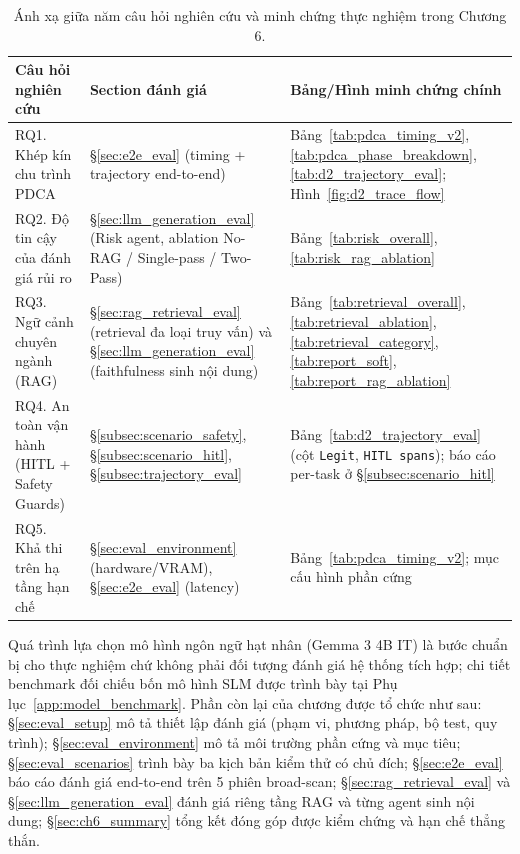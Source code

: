 \begin{table}[!htb]
  \centering
  \caption{Ánh xạ giữa năm câu hỏi nghiên cứu và minh chứng thực nghiệm trong Chương 6.}
  \label{tab:rq_metric_mapping}
  \small
  \begin{tabular}{p{3.6cm}p{6cm}p{4.8cm}}
    \toprule
    \textbf{Câu hỏi nghiên cứu} & \textbf{Section đánh giá} & \textbf{Bảng/Hình minh chứng chính} \\
    \midrule
    RQ1. Khép kín chu trình PDCA
       & \S\ref{sec:e2e_eval} (timing + trajectory end-to-end)
       & Bảng~\ref{tab:pdca_timing_v2}, \ref{tab:pdca_phase_breakdown}, \ref{tab:d2_trajectory_eval}; Hình~\ref{fig:d2_trace_flow} \\
    \addlinespace
    RQ2. Độ tin cậy của đánh giá rủi ro
       & \S\ref{sec:llm_generation_eval} (Risk agent, ablation No-RAG / Single-pass / Two-Pass)
       & Bảng~\ref{tab:risk_overall}, \ref{tab:risk_rag_ablation} \\
    \addlinespace
    RQ3. Ngữ cảnh chuyên ngành (RAG)
       & \S\ref{sec:rag_retrieval_eval} (retrieval đa loại truy vấn) và \S\ref{sec:llm_generation_eval} (faithfulness sinh nội dung)
       & Bảng~\ref{tab:retrieval_overall}, \ref{tab:retrieval_ablation}, \ref{tab:retrieval_category}, \ref{tab:report_soft}, \ref{tab:report_rag_ablation} \\
    \addlinespace
    RQ4. An toàn vận hành (HITL + Safety Guards)
       & \S\ref{subsec:scenario_safety}, \S\ref{subsec:scenario_hitl}, \S\ref{subsec:trajectory_eval}
       & Bảng~\ref{tab:d2_trajectory_eval} (cột \texttt{Legit}, \texttt{HITL spans}); báo cáo per-task ở \S\ref{subsec:scenario_hitl} \\
    \addlinespace
    RQ5. Khả thi trên hạ tầng hạn chế
       & \S\ref{sec:eval_environment} (hardware/VRAM), \S\ref{sec:e2e_eval} (latency)
       & Bảng~\ref{tab:pdca_timing_v2}; mục cấu hình phần cứng \\
    \bottomrule
  \end{tabular}
\end{table}

Quá trình lựa chọn mô hình ngôn ngữ hạt nhân (Gemma 3 4B IT) là bước chuẩn bị cho thực nghiệm chứ không phải đối tượng đánh giá hệ thống tích hợp; chi tiết benchmark đối chiếu bốn mô hình SLM được trình bày tại Phụ lục~\ref{app:model_benchmark}. Phần còn lại của chương được tổ chức như sau: \S\ref{sec:eval_setup} mô tả thiết lập đánh giá (phạm vi, phương pháp, bộ test, quy trình); \S\ref{sec:eval_environment} mô tả môi trường phần cứng và mục tiêu; \S\ref{sec:eval_scenarios} trình bày ba kịch bản kiểm thử có chủ đích; \S\ref{sec:e2e_eval} báo cáo đánh giá end-to-end trên 5 phiên broad-scan; \S\ref{sec:rag_retrieval_eval} và \S\ref{sec:llm_generation_eval} đánh giá riêng tầng RAG và từng agent sinh nội dung; \S\ref{sec:ch6_summary} tổng kết đóng góp được kiểm chứng và hạn chế thẳng thắn.


